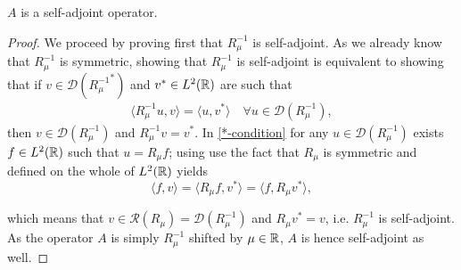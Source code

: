 \begin{theorem} \label{2.3:thm-ASelfAdjoint}
	$A$ is a self-adjoint operator.
		
	\begin{proof}
		We proceed by proving first that $R_{\mu}^{-1}$ is self-adjoint. As we already know that $R_{\mu}^{-1}$ is symmetric, showing that $R_{\mu}^{-1}$ is self-adjoint is equivalent to showing that if $v \in \mathcal{D}({R_{\mu}^{-1}}^{*})$ and $v^{*} \in L^{2}(\mathbb{R})$ are such that
		\begin{align}
			\langle R_{\mu}^{-1} u, v \rangle = \langle u, v^{*} \rangle \quad \forall u \in \mathcal{D}(R_{\mu}^{-1}), \label{*-condition}
		\end{align}
		then $v \in \mathcal{D}(R_{\mu}^{-1})$ and $R_{\mu}^{-1} v = v^{*}$.
		In \eqref{*-condition} for any $u \in \mathcal{D}(R_{\mu}^{-1})$ exists $f \in L^{2}(\mathbb{R})$ such that $u = R_{\mu} f$; using use the fact that $R_{\mu}$ is symmetric and defined on the whole of $L^{2}(\mathbb{R})$ yields
		\[  \langle f, v \rangle = \langle R_{\mu} f, v^{*} \rangle = \langle f, R_{\mu} v^{*} \rangle, \]
		
		which means that $v \in \mathcal{R}(R_{\mu}) = \mathcal{D}(R_{\mu}^{-1})$ and $R_{\mu} v^{*} = v$, i.e. $R_{\mu}^{-1}$ is self-adjoint. As the operator $A$ is simply $R_{\mu}^{-1}$ shifted by $\mu \in \mathbb{R}$, $A$ is hence self-adjoint as well.		
	\end{proof}
\end{theorem}